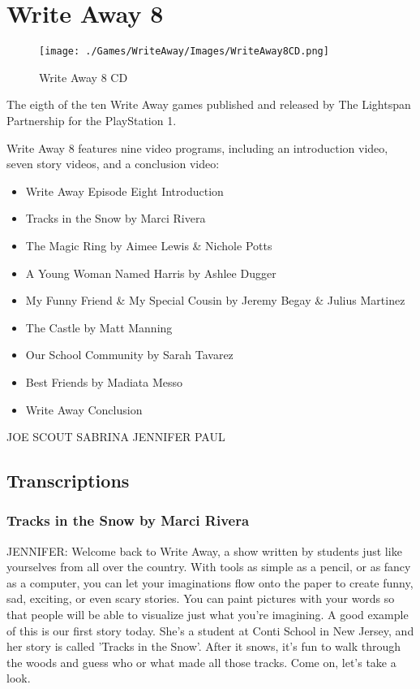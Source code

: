 \chapter{Write Away 8}

\begin{figure}[H]
    \centering
    \texttt{[image: ./Games/WriteAway/Images/WriteAway8CD.png]}
    \caption{Write Away 8 CD}
\end{figure}

The eigth of the ten Write Away games published and released by The Lightspan Partnership for the PlayStation 1.

Write Away 8 features nine video programs, including an introduction video, seven story videos, and a conclusion video:

\begin{itemize}
    \item Write Away Episode Eight Introduction
    \item Tracks in the Snow by Marci Rivera
    \item The Magic Ring by Aimee Lewis \& Nichole Potts
    \item A Young Woman Named Harris by Ashlee Dugger
    \item My Funny Friend \& My Special Cousin by Jeremy Begay \& Julius Martinez
    \item The Castle by Matt Manning
    \item Our School Community by Sarah Tavarez
    \item Best Friends by Madiata Messo
    \item Write Away Conclusion
\end{itemize}

\clearpage
\newpage

JOE
SCOUT
SABRINA
JENNIFER
PAUL

\section{Transcriptions}

\subsection{Tracks in the Snow by Marci Rivera}

JENNIFER:
Welcome back to Write Away, a show written by students just like yourselves from all over the country.
With tools as simple as a pencil, or as fancy as a computer, you can let your imaginations flow onto the paper to create funny, sad, exciting, or even scary stories.
You can paint pictures with your words so that people will be able to visualize just what you're imagining.
A good example of this is our first story today.
She's a student at Conti School in New Jersey, and her story is called 'Tracks in the Snow'.
After it snows, it's fun to walk through the woods and guess who or what made all those tracks.
Come on, let's take a look.

